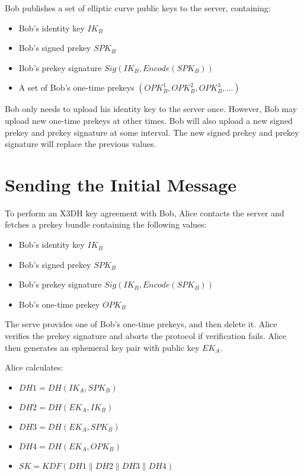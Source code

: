 Bob publishes a set of elliptic curve public keys to the server, containing:

\begin{itemize}
  \item Bob's identity key $IK_B$
  \item Bob's signed prekey $SPK_B$
  \item Bob's prekey signature $Sig(IK_B, Encode(SPK_B))$
  \item A set of Bob's one-time prekeys $(OPK_B^1, OPK_B^2, OPK_B^3, ...)$
\end{itemize}

Bob only needs to upload his identity key to the server once. However, Bob may upload new one-time prekeys at other times. Bob will also upload a new signed prekey and prekey signature at some interval. The new signed prekey and prekey signature will replace the previous values.

\section{Sending the Initial Message}
\label{sec:SendingTheInitialMessage}

To perform an X3DH key agreement with Bob, Alice contacts the server and fetches a prekey bundle containing the following values:
  
\begin{itemize}
  \item Bob's identity key $IK_B$
  \item Bob's signed prekey $SPK_B$
  \item Bob's prekey signature $Sig(IK_B, Encode(SPK_B))$
  \item Bob's one-time prekey $OPK_B$
\end{itemize}

The serve provides one of Bob's one-time prekeys, and then delete it. Alice verifies the prekey signature and aborts the protocol if verification fails. Alice then generates an ephemeral key pair with public key $EK_A$.

Alice calculates:

\begin{itemize}
  \item $DH1 = DH(IK_A, SPK_B)$
  \item $DH2 = DH(EK_A, IK_B)$
  \item $DH3 = DH(EK_A, SPK_B)$
  \item $DH4 = DH(EK_A, OPK_B)$
  \item $SK = KDF(DH1 \| DH2 \| DH3 \| DH4)$
\end{itemize}


